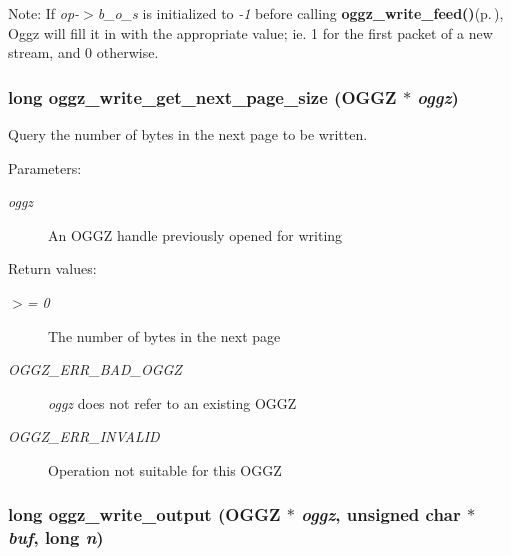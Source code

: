 \begin{Desc}
\item[Note:]If {\em op-$>$b\_\-o\_\-s\/} is initialized to {\em -1\/} before calling {\bf oggz\_\-write\_\-feed()}{\rm (p.\,\pageref{group__write__api_a2})}, Oggz will fill it in with the appropriate value; ie. 1 for the first packet of a new stream, and 0 otherwise. \end{Desc}
\subsubsection{\setlength{\rightskip}{0pt plus 5cm}long oggz\_\-write\_\-get\_\-next\_\-page\_\-size ({\bf OGGZ} $\ast$ {\em oggz})}\label{group__write__api_a5}


Query the number of bytes in the next page to be written. 

\begin{Desc}
\item[Parameters:]
\begin{description}
\item[{\em oggz}]An OGGZ handle previously opened for writing \end{description}
\end{Desc}
\begin{Desc}
\item[Return values:]
\begin{description}
\item[{\em $>$= 0}]The number of bytes in the next page \item[{\em OGGZ\_\-ERR\_\-BAD\_\-OGGZ}]{\em oggz\/} does not refer to an existing OGGZ \item[{\em OGGZ\_\-ERR\_\-INVALID}]Operation not suitable for this OGGZ \end{description}
\end{Desc}
\subsubsection{\setlength{\rightskip}{0pt plus 5cm}long oggz\_\-write\_\-output ({\bf OGGZ} $\ast$ {\em oggz}, unsigned char $\ast$ {\em buf}, long {\em n})}\label{group__write__api_a3}


